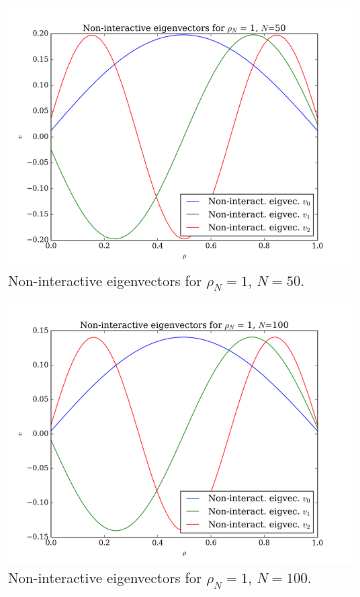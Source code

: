 \documentclass[11pt,a4paper,notitlepage]{article}
\begin{document}
\begin{figure}[H]
 \center
 	\begin{subfigure}[t]{0.45\textwidth}
 		\includegraphics[scale=0.40]{../non_interacting_eigvec_plot_rhoN=1_N=50.png}
 		\caption{Non-interactive eigenvectors for $\rho_N = 1$, $N = 50$.}\label{fig:eigvecs-non-interact-1-50}
 	\end{subfigure}
 	\hfill
 	\begin{subfigure}[t]{0.45\textwidth}
 		\includegraphics[scale=0.40]{../non_interacting_eigvec_plot_rhoN=1_N=100.png}
 		\caption{Non-interactive eigenvectors for $\rho_N = 1$, $N = 100$.}\label{fig:eigvecs-non-interact-1-100}
 	\end{subfigure}
 	\begin{subfigure}[b]{0.45\textwidth}

\end{subfigure}
\end{figure}
\end{document}
